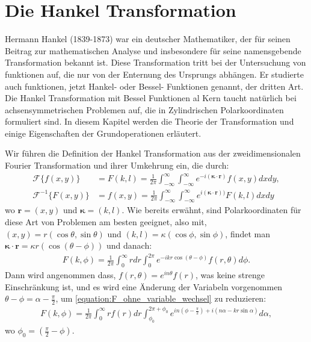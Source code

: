 %
%

\section{Die Hankel Transformation \label{kreismembran:section:teil1}}

Hermann Hankel (1839-1873) war ein deutscher Mathematiker, der für seinen Beitrag zur mathematischen Analyse und insbesondere für seine namensgebende Transformation bekannt ist.
Diese Transformation tritt bei der Untersuchung von funktionen auf, die nur von der Enternung des Ursprungs abhängen.
Er studierte auch funktionen, jetzt Hankel- oder Bessel- Funktionen genannt, der dritten Art.
Die Hankel Transformation mit Bessel Funktionen al Kern taucht natürlich bei achsensymmetrischen Problemen auf, die in Zylindrischen Polarkoordinaten formuliert sind.
In diesem Kapitel werden die Theorie der Transformation und einige Eigenschaften der Grundoperationen erläutert.

Wir führen die Definition der Hankel Transformation aus der zweidimensionalen Fourier Transformation und ihrer Umkehrung ein, die durch:
\begin{align}
	\mathscr{F}\{f(x,y)\} & = F(k,l)=\frac{1}{2\pi}\int_{-\infty}^{\infty}\int_{-\infty}^{\infty}e^{-i( \bm{\kappa}\cdot \mathbf{r})}f(x,y) dx dy,\label{equation:fourier_transform}\\
	\mathscr{F}^{-1}\{F(x,y)\} & = f(x,y)=\frac{1}{2\pi}\int_{-\infty}^{\infty}\int_{-\infty}^{\infty}e^{i(\bm{\kappa}\cdot \mathbf{r}))}F(k,l) dx dy \label{equation:inv_fourier_transform}
\end{align}
wo $\mathbf{r}=(x,y)$ und $\bm{\kappa}=(k,l)$. Wie bereits erwähnt, sind Polarkoordinaten für diese Art von Problemen am besten geeignet, also mit, $(x,y)=r(\cos\theta,\sin\theta)$ und $(k,l)=\kappa(\cos\phi,\sin\phi)$, findet man $\bm{\kappa}\cdot\mathbf{r}=\kappa r(\cos(\theta-\phi))$ und danach:
\begin{align}
	F(k,\phi)=\frac{1}{2\pi}\int_{0}^{\infty}r dr \int_{0}^{2\pi}e^{-ikr\cos(\theta-\phi)}f(r,\theta) d\phi.
	\label{equation:F_ohne_variable_wechsel}
\end{align}
Dann wird angenommen dass, $f(r,\theta)=e^{in\theta}f(r)$, was keine strenge Einschränkung ist, und es wird eine Änderung der Variabeln vorgenommen $\theta-\phi=\alpha-\frac{\pi}{2}$, um \ref{equation:F_ohne_variable_wechsel} zu reduzieren:
\begin{align}
	F(k,\phi)=\frac{1}{2\pi}\int_{0}^{\infty}rf(r) dr \int_{\phi_{0}}^{2\pi+\phi_{0}}e^{in(\phi-\frac{\pi}{2})+i(n\alpha-kr\sin\alpha)} d\alpha,
	\label{equation:F_ohne_bessel}
\end{align}
wo $\phi_{0}=(\frac{\pi}{2}-\phi)$.

